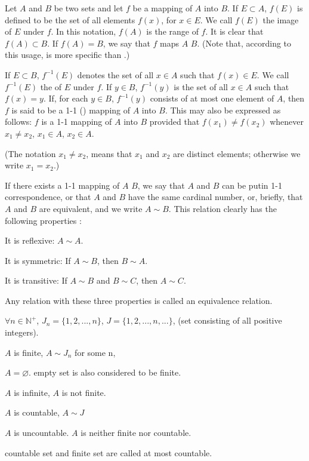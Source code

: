\begin{mydef}
    \label{mydef:2.2}
    Let $A$ and $B$ be two sets and let $f$ be a mapping of $A$ into $B$.
    If $E \subset A$, $f(E)$ is defined to be the set of all elements $f(x)$, for $x \in E$. We call $f(E)$ the image of $E$ under $f$. In this notation, $f(A)$ is the range of $f$. It is clear that $f(A) \subset B$. If $f(A) = B$, we say that $f$ maps $A$  $B$. (Note that, according
    to this usage,  is more specific than .)

    If $E \subset B$, $f^{-1}(E)$ denotes the set of all $x \in A$ such that $f(x)\in E$. We call $f^{-1}(E)$ the  of $E$ under $f$. If $y \in B$, $f^{-1}(y)$ is the set of all $x \in A$ such that $f(x) =y$. If, for each $y\in B$, $f^{-1}(y)$ consists of at most one element of $A$, then $f$ is said to be a 1-1 () mapping of $A$ into $B$. This may also be expressed as follows: $f$ is a 1-1 mapping of $A$ into $B$ provided that $f(x_1) \neq f(x_2)$ whenever $x_1 \neq x_2$, $x_1 \in A$, $x_2 \in A$.

    (The notation $x_1 \neq x_2$, means that $x_1$ and $x_2$ are distinct elements; otherwise we write $x_1 = x_2$.)
\end{mydef}

\begin{mydef}
    \label{mydef:2.3}
    If there exists a 1-1 mapping of $A$  $B$, we say that $A$ and $B$ can be putin 1-1 correspondence, or that $A$ and $B$ have the same cardinal number, or, briefly, that $A$ and $B$ are equivalent, and we write $A\sim B$. This relation
    clearly has the following properties :

    It is reflexive: $A\sim A$.

    It is symmetric: If $A\sim B$, then $B\sim A$.

    It is transitive: If $A\sim B$ and $B\sim C$, then $A\sim C$.

    Any relation with these three properties is called an equivalence relation.    
\end{mydef}

\begin{mydef}
    \label{mydef:2.4}
    $\forall n\in \mathbb{N}^+$, $J_n = \{1,2,...,n\}$, $J = \{1,2,...,n,...\}$, (set consisting of all positive integers).

    $A$ is finite, $A\sim J_n$ for some n,

    $A = \varnothing$. empty set is also considered to be finite.

    $A$ is infinite, $A$ is not finite.

    $A$ is countable, $A \sim J$
    
    $A$ is uncountable. $A$ is neither finite nor countable.

    countable set and finite set are called at most countable.
\end{mydef}

